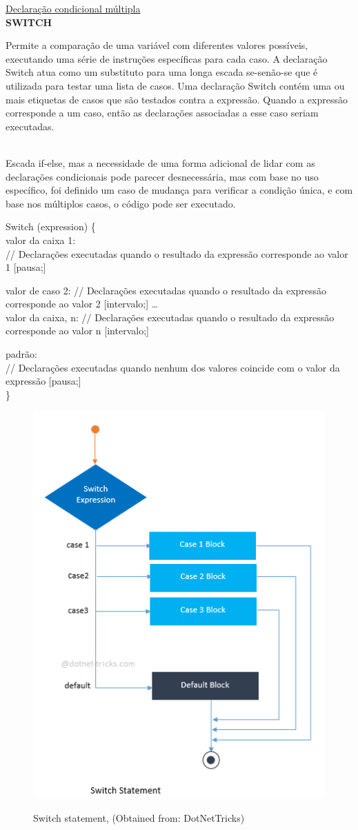 \documentclass[11pt, letterpaper, portuguese]{article}
\begin{document}
\vspace{0.5 cm}
\underline{Declaração condicional múltipla}\\
\textbf{SWITCH}
\par{Permite a comparação de uma variável com diferentes valores possíveis, executando uma série de instruções específicas para cada caso. A declaração Switch atua como um substituto para uma longa escada se-senão-se que é utilizada para testar uma lista de casos. Uma declaração Switch contém uma ou mais etiquetas de casos que são testados contra a expressão. Quando a expressão corresponde a um caso, então as declarações associadas a esse caso seriam executadas.

\\
Escada if-else, mas a necessidade de uma forma adicional de lidar com as declarações condicionais pode parecer desnecessária, mas com base no uso específico, foi definido um caso de mudança para verificar a condição única, e com base nos múltiplos casos, o código pode ser executado.}
\vspace{0.5 cm}
Switch (expression) \{ \\
   valor da caixa 1: \\
     //  Declarações executadas quando o resultado da expressão
     corresponde ao valor 1
      [pausa;]
 
     
     \vspace{0.5 cm}
     
valor de caso 2:
// Declarações executadas quando o resultado da expressão
corresponde ao valor 2 [intervalo;] …
 \\
 
  valor da caixa, n:
// Declarações executadas quando o resultado da expressão
corresponde ao valor n [intervalo;]

   padrão: \\
     // Declarações executadas quando nenhum dos valores coincide com o valor da expressão
\vspace{0.5 cm}
     [pausa;] \\
\} \\

\begin{figure}
	    \centering
		\caption{Switch statement, (Obtained from: {DotNetTricks})}
		\includegraphics[width=0.5 \textwidth]{switch.png}
		\label{Imagen_Switch}
	\end{figure}
	
\end{document}
